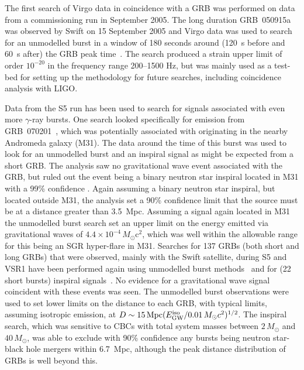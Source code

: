 \documentclass{article}
\begin{document}
The first search of Virgo data in coincidence with a GRB was performed on data
from a commissioning run in September 2005. The long duration GRB~050915a was
observed by Swift on 15 September 2005 and Virgo data was used to search for an
unmodelled burst in a window of 180 seconds around (120~s before and 60~s after)
the GRB peak time~\cite{Acernese:2008a}. The search produced a strain upper
limit of order $10^{-20}$ in the frequency range 200--1500 Hz, but was mainly
used as a test-bed for setting up the methodology for future searches, including
coincidence analysis with LIGO.

Data from the S5 run has been used to search for signals associated with even
more $\gamma$-ray bursts. One search looked specifically for emission from
GRB~070201~\cite{Golenetskii:2007a, Golenetskii:2007b}, which was potentially
associated with originating in the nearby Andromeda galaxy (M31). The data
around the time of this burst was used to look for an unmodelled burst and an
inspiral signal as might be expected from a short GRB. The analysis saw no
gravitational wave event associated with the GRB, but ruled out the event being
a binary neutron star inspiral located in M31 with a 99\% confidence
\cite{Abbott:2008g}. Again assuming a binary neutron star inspiral, but located
outside M31, the analysis set a 90\% confidence limit that the source must be at
a distance greater than 3.5~Mpc. Assuming a signal again located in M31 the
unmodelled burst search set an upper limit on the energy emitted via
gravitational waves of $4.4\times10^{-4}\,M_{\odot}$c$^2$, which was
well within the allowable range for this being an SGR hyper-flare in M31.
Searches for 137 GRBs (both short and long GRBs) that were observed, mainly with
the Swift satellite, during S5 and VSR1 have been performed again using
unmodelled burst methods~\cite{Abbott:2009d} and for (22 short bursts) inspiral
signals~\cite{Abadie:2010b}. No evidence for a gravitational wave signal
coincident with these events was seen. The unmodelled burst observations were
used to set lower limits on the distance to each GRB, with typical limits,
assuming isotropic emission, at $D\sim15\,{\rm Mpc}(E^{\rm iso}_{\rm
GW}/0.01\,M_{\odot}c^2)^{1/2}$. The inspiral search, which was sensitive to CBCs
with total system masses between $2\,M_{\odot}$ and $40\,M_{\odot}$, was able to
exclude with 90\% confidence any bursts being neutron star-black hole mergers
within 6.7~Mpc, although the peak distance distribution of GRBs is well beyond
this.
\end{document}
